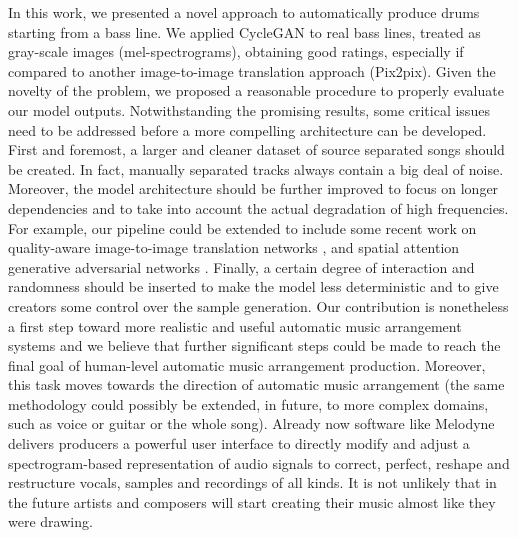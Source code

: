 \documentclass[journal]{IEEEtran}
\begin{document}
In this work, we presented a novel approach to automatically produce drums starting from a bass line. We applied CycleGAN to real bass lines, treated as gray-scale images (mel-spectrograms), obtaining good ratings, especially if compared to another image-to-image translation approach (Pix2pix). Given the novelty of the problem, we proposed a reasonable procedure to properly evaluate our model outputs. Notwithstanding the promising results, some critical issues need to be addressed before a more compelling architecture can be developed. First and foremost, a larger and cleaner dataset of source separated songs should be created. In fact, manually separated tracks always contain a big deal of noise. Moreover, the model architecture should be further improved to focus on longer dependencies and to take into account the actual degradation of high frequencies. For example, our pipeline could be extended to include some recent work on quality-aware image-to-image translation networks \cite{8673660}, and spatial attention generative adversarial networks \cite{9007501}. Finally, a certain degree of interaction and randomness should be inserted to make the model less deterministic and to give creators some control over the sample generation.  
Our contribution is nonetheless a first step toward more realistic and useful automatic music arrangement systems and we believe that further significant steps could be made to reach the final goal of human-level automatic music arrangement production. 
Moreover, this task moves towards the direction of automatic music arrangement (the same methodology could possibly be extended, in future, to more complex domains, such as voice or guitar or the whole song). 
Already now software like Melodyne \cite{neubacker2011sound,senior2009celemony}
delivers producers a powerful user interface to directly %
modify and adjust a spectrogram-based representation of audio signals to correct, perfect, reshape and restructure vocals, samples and recordings of all kinds. 
It is not unlikely that in the future artists and composers will start creating their music almost like they were drawing.


\end{document}
